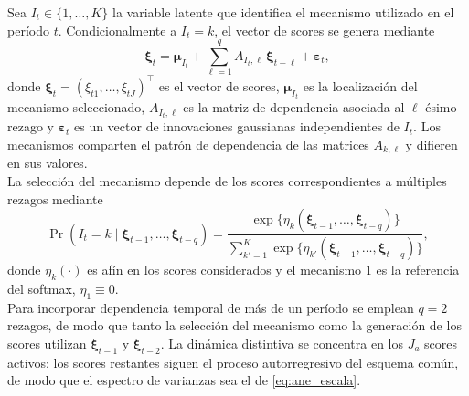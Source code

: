 Sea $I_t\in\{1,\ldots,K\}$ la variable latente que identifica el mecanismo utilizado en el período $t$. Condicionalmente a $I_t=k$, el vector de scores se genera mediante
\begin{equation}
\label{eq:ane_algC3}
\boldsymbol{\xi}_t
=
\boldsymbol{\mu}_{I_t}
+
\sum_{\ell=1}^{q}
A_{I_t,\ell}\,
\boldsymbol{\xi}_{t-\ell}
+
\boldsymbol{\varepsilon}_t,
\end{equation}
donde $\boldsymbol{\xi}_t=(\xi_{t1},\ldots,\xi_{tJ})^\top$ es el vector de scores, $\boldsymbol{\mu}_{I_t}$ es la localización del mecanismo seleccionado, $A_{I_t,\ell}$ es la matriz de dependencia asociada al $\ell$-ésimo rezago y $\boldsymbol{\varepsilon}_t$ es un vector de innovaciones gaussianas independientes de $I_t$. Los mecanismos comparten el patrón de dependencia de las matrices $A_{k,\ell}$ y difieren en sus valores.\\

La selección del mecanismo depende de los scores correspondientes a múltiples rezagos mediante
\begin{equation}
\label{eq:ane_algC3_asignacion}
\Pr
\left(
I_t=k
\mid
\boldsymbol{\xi}_{t-1},
\ldots,
\boldsymbol{\xi}_{t-q}
\right)
=
\frac{
\exp\bigl\{
\eta_k
\left(
\boldsymbol{\xi}_{t-1},
\ldots,
\boldsymbol{\xi}_{t-q}
\right)
\bigr\}
}{
\displaystyle
\sum_{k'=1}^{K}
\exp\bigl\{
\eta_{k'}
\left(
\boldsymbol{\xi}_{t-1},
\ldots,
\boldsymbol{\xi}_{t-q}
\right)
\bigr\}
},
\end{equation}
donde $\eta_k(\cdot)$ es afín en los scores considerados y el mecanismo 1 es la referencia del softmax, $\eta_1\equiv 0$.\\

Para incorporar dependencia temporal de más de un período se emplean $q=2$ rezagos, de modo que tanto la selección del mecanismo como la generación de los scores utilizan $\boldsymbol{\xi}_{t-1}$ y $\boldsymbol{\xi}_{t-2}$. La dinámica distintiva se concentra en los $J_a$ scores activos; los scores restantes siguen el proceso autorregresivo del esquema común, de modo que el espectro de varianzas sea el de \eqref{eq:ane_escala}.\\

